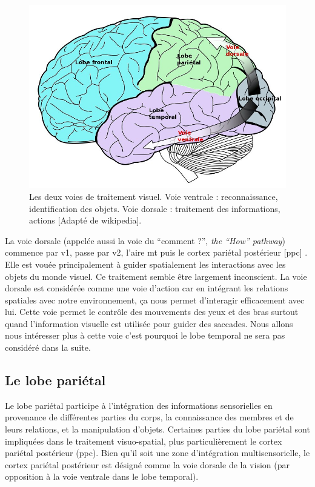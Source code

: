\begin{figure}
\begin{center}
\includegraphics[width=12cm,height=8cm]{figures/ch2_4_Lobes}
\end{center}
\caption{ Les deux voies de traitement visuel. Voie ventrale : reconnaissance, identification des objets. Voie dorsale : traitement des informations, actions [Adapté de wikipedia].}
\label{path}
\end{figure}

La voie dorsale (appelée aussi la voie du ``comment ?'', \textit{the ``How'' pathway}) commence par \gls{v1}, passe par \gls{v2}, l'aire \gls{mt} puis le cortex pariétal postérieur [\gls{ppc}] \cite{Goodale:1992}. Elle est vouée principalement à guider spatialement les interactions avec les objets du monde visuel. Ce traitement semble être largement inconscient. La voie dorsale est considérée comme une voie d'action car en intégrant les relations spatiales avec notre environnement, ça nous permet d'interagir efficacement avec lui. Cette voie permet le contrôle des mouvements des yeux et des bras surtout quand l'information visuelle est utilisée pour guider des saccades. Nous allons nous intéresser plus à cette voie c'est pourquoi le lobe temporal ne sera pas considéré dans la suite.\\


\subsection{Le lobe pariétal}

Le lobe pariétal participe à l'intégration des informations sensorielles en provenance de différentes parties du corps, la connaissance des membres et de leurs relations, \cite{Blakemore:2005, Fogassi:2005} et  la manipulation d'objets. Certaines parties du lobe pariétal sont impliquées dans le traitement visuo-spatial, plus particulièrement le cortex pariétal postérieur (\gls{ppc}). Bien qu'il soit une zone d'intégration multisensorielle, le cortex pariétal postérieur est désigné comme la voie dorsale de la vision (par opposition à la voie ventrale dans le lobe temporal). \\

